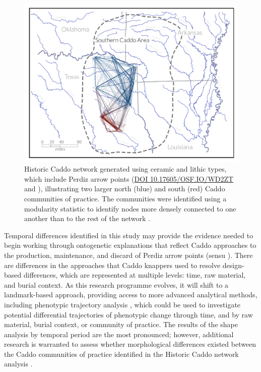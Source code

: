 \documentclass[review]{elsarticle}
\begin{document}
\begin{figure}[h!]\centering
\includegraphics[width=\linewidth]{fig.net.pdf}
\caption{Historic Caddo network generated using ceramic and lithic types, which include Perdiz arrow points (\href{https://osf.io/bt2q9/}{DOI 10.17605/OSF.IO/WD2ZT} and \citealt{RN8031}), illustrating two larger north (blue) and south (red) Caddo communities of practice. The communities were identified using a modularity statistic to identify nodes more densely connected to one another than to the rest of the network \citep{RN8051,RN8024}.}
\label{fig:fig.net}
\end{figure}

Temporal differences identified in this study may provide the evidence needed to begin working through ontogenetic explanations that reflect Caddo approaches to the production, maintenance, and discard of Perdiz arrow points (sensu \citealt{RN5871}). There are differences in the approaches that Caddo knappers used to resolve design-based differences, which are represented at multiple levels: time, raw material, and burial context. As this research programme evolves, it will shift to a landmark-based approach, providing access to more advanced analytical methods, including phenotypic trajectory analysis \citep{RN8352,RN8561,RN8544,RN8560}, which could be used to investigate potential differential trajectories of phenotypic change through time, and by raw material, burial context, or community of practice. The results of the shape analysis by temporal period are the most pronounced; however, additional research is warranted to assess whether morphological differences existed between the Caddo communities of practice identified in the Historic Caddo network analysis \citep{RN8031}.
\end{document}
